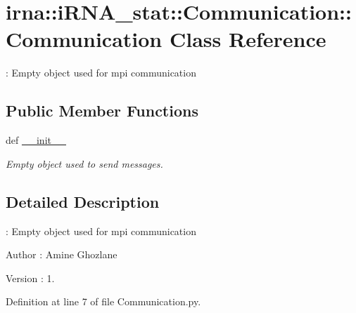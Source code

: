 \hypertarget{classirna_1_1iRNA__stat_1_1Communication_1_1Communication}{
\section{irna\-:\-:i\-R\-N\-A\-\_\-stat\-:\-:\-Communication\-:\-:\-Communication \-Class \-Reference}
\label{classirna_1_1iRNA__stat_1_1Communication_1_1Communication}
}


\-: \-Empty object used for mpi communication  


\subsection*{\-Public \-Member \-Functions}
\begin{DoxyCompactItemize}
\item 
def \hyperlink{classirna_1_1iRNA__stat_1_1Communication_1_1Communication_a4a4b695f557b4b69528b32de28cd0b80}{\-\_\-\-\_\-init\-\_\-\-\_\-}
\begin{DoxyCompactList}\small\item\em \-Empty object used to send messages. \end{DoxyCompactList}\end{DoxyCompactItemize}


\subsection{\-Detailed \-Description}
\-: \-Empty object used for mpi communication 

\begin{DoxyAuthor}{\-Author}
\-: \-Amine \-Ghozlane 
\end{DoxyAuthor}
\begin{DoxyVersion}{\-Version}
\-: 1. 
\end{DoxyVersion}


\-Definition at line 7 of file \-Communication.\-py.



